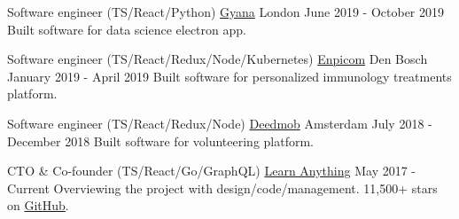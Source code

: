 
\begin{cventries}

  \cventry
    {Software engineer (TS/React/Python)}
    {\href{https://www.gyana.co.uk}{Gyana}}
    {London}
    {June 2019 - October 2019}
    {
      {Built software for data science electron app.}
    }

  \cventry
    {Software engineer (TS/React/Redux/Node/Kubernetes)}
    {\href{https://www.enpicom.com}{Enpicom}}
    {Den Bosch}
    {January 2019 - April 2019}
    {
      {Built software for personalized immunology treatments platform.}
    }

  \cventry
    {Software engineer (TS/React/Redux/Node)}
    {\href{https://www.deedmob.com}{Deedmob}}
    {Amsterdam}
    {July 2018 - December 2018}
    {
      {Built software for volunteering platform.}
    }

  \cventry
    {CTO \& Co-founder (TS/React/Go/GraphQL)}
    {\href{https://learn-anything.xyz}{Learn Anything}}
    {}
    {May 2017 - Current}
    {
      {Overviewing the project with design/code/management. 11,500+ stars on \href{https://github.com/learn-anything/learn-anything}{GitHub}.}
    }

\end{cventries}

